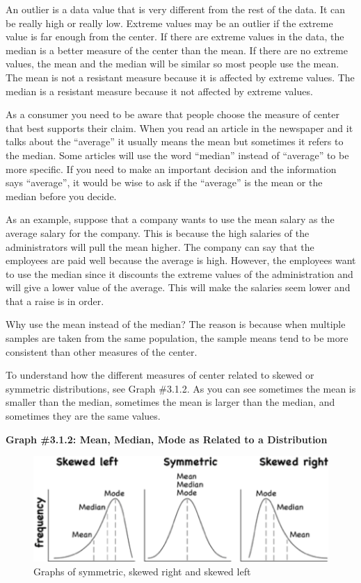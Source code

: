 \documentclass[
]{book}
\begin{document}
An outlier is a data value that is very different from the rest of the data. It can be really high or really low. Extreme values may be an outlier if the extreme value is far enough from the center. If there are extreme values in the data, the median is a better measure of the center than the mean. If there are no extreme values, the mean and the median will be similar so most people use the mean. The mean is not a resistant measure because it is affected by extreme values. The median is a resistant measure because it not affected by extreme values.

As a consumer you need to be aware that people choose the measure of center that best supports their claim. When you read an article in the newspaper and it talks about the ``average'' it usually means the mean but sometimes it refers to the median. Some articles will use the word ``median'' instead of ``average'' to be more specific. If you need to make an important decision and the information says ``average'', it would be wise to ask if the ``average'' is the mean or the median before you decide.

As an example, suppose that a company wants to use the mean salary as the average salary for the company. This is because the high salaries of the administrators will pull the mean higher. The company can say that the employees are paid well because the average is high. However, the employees want to use the median since it discounts the extreme values of the administration and will give a lower value of the average. This will make the salaries seem lower and that a raise is in order.

Why use the mean instead of the median? The reason is because when multiple samples are taken from the same population, the sample means tend to be more consistent than other measures of the center.

To understand how the different measures of center related to skewed or symmetric distributions, see Graph \#3.1.2. As you can see sometimes the mean is smaller than the median, sometimes the mean is larger than the median, and sometimes they are the same values.

\textbf{Graph \#3.1.2: Mean, Median, Mode as Related to a Distribution}

\begin{figure}
\centering
\includegraphics{centers_distribution.png}
\caption{Graphs of symmetric, skewed right and skewed left}
\end{figure}
\end{document}
